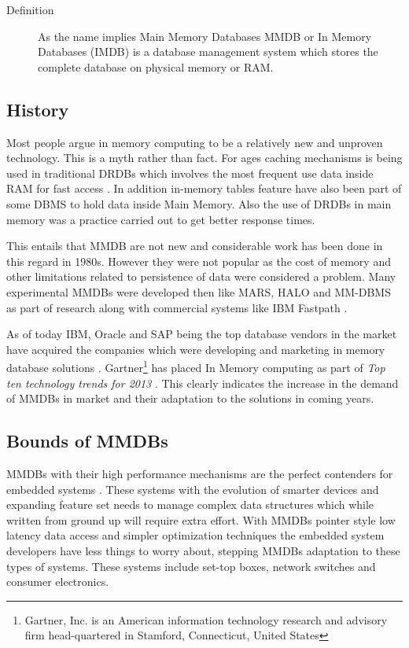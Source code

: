\documentclass[12pt]{article} %
\begin{document}
\begin{description}
  \item[Definition] As the name implies Main Memory Databases MMDB or In Memory Databases (IMDB) is a database management system which stores the complete database on physical memory or RAM. 
\end{description}

\subsection{History}
Most people argue in memory computing to be a relatively new and unproven technology. This is a myth rather than fact. For ages caching mechanisms is being used in traditional DRDBs which involves the most frequent use data inside RAM for fast access \cite{Mcobject-Myths} . In addition in-memory tables feature have also been part of some DBMS to hold data inside Main Memory. Also the use of DRDBs in main memory was a practice carried out to get better response times. 

This entails that MMDB are not new and considerable work has been done in this regard in 1980s. However they were not popular as the cost of memory and other limitations related to persistence of data were considered a problem. Many experimental MMDBs were developed then like MARS, HALO and MM-DBMS as part of research along with commercial systems like IBM Fastpath \cite{garcia1992main}. 

As of today IBM, Oracle and SAP being the top database vendors in the market have acquired the companies which were developing and marketing in memory database solutions \cite{pressRgiants}. Gartner\footnote{Gartner, Inc. is an American information technology research and advisory firm head-quartered in Stamford, Connecticut, United States} has placed In Memory computing as part of \emph{Top ten technology trends for 2013} \cite{gartner}. This clearly indicates the increase in the demand of MMDBs in market and their adaptation to the solutions in coming years.  

\subsection{Bounds of MMDBs}
MMDBs with their high performance mechanisms are the perfect contenders for embedded systems \cite{graves2002memory}. These systems with the evolution of smarter devices and expanding feature set needs to manage complex data structures which while written from ground up will require extra effort. With MMDBs pointer style low latency data access and simpler optimization techniques the embedded system developers have less things to worry about, stepping MMDBs adaptation to these types of systems. These systems include set-top boxes, network switches and consumer electronics. 
\end{document}
